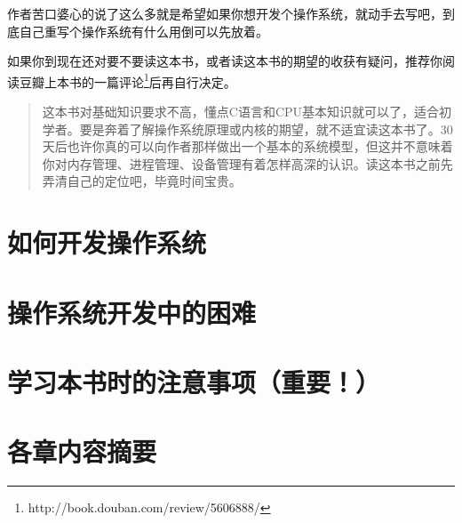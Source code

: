 作者苦口婆心的说了这么多就是希望如果你想开发个操作系统，就动手去写吧，到底自己重写个操作系统有什么用倒可以先放着。

如果你到现在还对要不要读这本书，或者读这本书的期望的收获有疑问，推荐你阅读豆瓣上本书的一篇评论\footnote{ http://book.douban.com/review/5606888/ }后再自行决定。
\begin{quote}
这本书对基础知识要求不高，懂点C语言和CPU基本知识就可以了，适合初学者。要是奔着了解操作系统原理或内核的期望，就不适宜读这本书了。30天后也许你真的可以向作者那样做出一个基本的系统模型，但这并不意味着你对内存管理、进程管理、设备管理有着怎样高深的认识。读这本书之前先弄清自己的定位吧，毕竟时间宝贵。
\end{quote}

\section{	如何开发操作系统	}
\section{	操作系统开发中的困难	}
\section{	学习本书时的注意事项（重要！）	}
\section{	各章内容摘要	}

